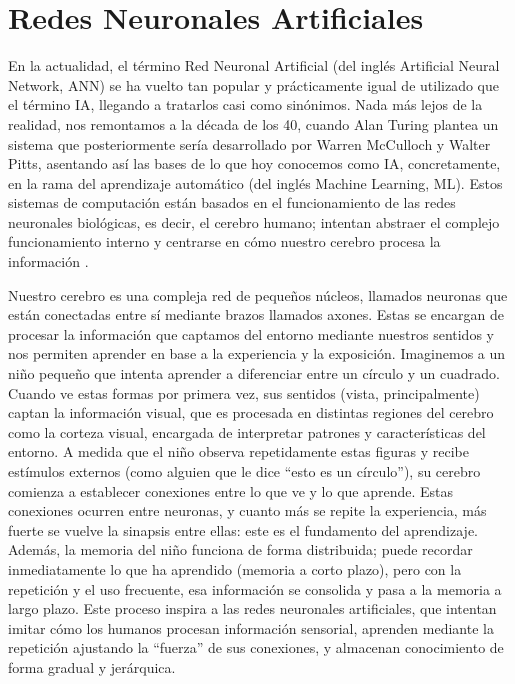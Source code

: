 \chapter{Redes Neuronales Artificiales}\label{cap:red_neuronal_tradicional}

En la actualidad, el término Red Neuronal Artificial (del inglés Artificial Neural Network, ANN) se ha vuelto tan popular y prácticamente igual de utilizado que el término IA, llegando a tratarlos casi como sinónimos. Nada más lejos de la realidad, nos remontamos a la década de los 40, cuando Alan Turing plantea un sistema que posteriormente sería desarrollado por Warren McCulloch y Walter Pitts, asentando así las bases de lo que hoy conocemos como IA, concretamente, en la rama del aprendizaje automático (del inglés Machine Learning, ML). Estos sistemas de computación están basados en el funcionamiento de las redes neuronales biológicas, es decir, el cerebro humano; intentan abstraer el complejo funcionamiento interno y centrarse en cómo nuestro cerebro procesa la información \cite{rna_fundamentos__hilera_2021}.

Nuestro cerebro es una compleja red de pequeños núcleos, llamados neuronas que están conectadas entre sí mediante brazos llamados axones. Estas se encargan de procesar la información que captamos del entorno mediante nuestros sentidos y nos permiten aprender en base a la experiencia y la exposición. Imaginemos a un niño pequeño que intenta aprender a diferenciar entre un círculo y un cuadrado. Cuando ve estas formas por primera vez, sus sentidos (vista, principalmente) captan la información visual, que es procesada en distintas regiones del cerebro como la corteza visual, encargada de interpretar patrones y características del entorno. A medida que el niño observa repetidamente estas figuras y recibe estímulos externos (como alguien que le dice “esto es un círculo”), su cerebro comienza a establecer conexiones entre lo que ve y lo que aprende. Estas conexiones ocurren entre neuronas, y cuanto más se repite la experiencia, más fuerte se vuelve la sinapsis entre ellas: este es el fundamento del aprendizaje. Además, la memoria del niño funciona de forma distribuida; puede recordar inmediatamente lo que ha aprendido (memoria a corto plazo), pero con la repetición y el uso frecuente, esa información se consolida y pasa a la memoria a largo plazo. Este proceso inspira a las redes neuronales artificiales, que intentan imitar cómo los humanos procesan información sensorial, aprenden mediante la repetición ajustando la “fuerza” de sus conexiones, y almacenan conocimiento de forma gradual y jerárquica.

